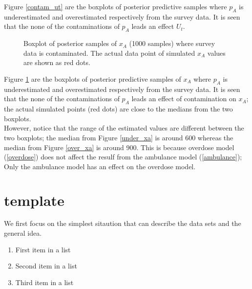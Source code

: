 \documentclass[
10pt, %
a4paper, %
oneside, %
headinclude,footinclude, %
BCOR5mm, %
]{scrartcl}
\begin{document}
Figure \ref{contam_ut} are the boxplots of posterior predictive samples where $p_A$ is underestimated and overestimated respectively from the survey data. It is seen that the none of the contaminations of $p_A$ leads an effect  $U_t$.\\

\begin{figure}[htb]
	\centering
	\caption[two early result box plots:xa]{Boxplot of posterior samples of $x_A$ (1000 samples) where survey data is contaminated.  The actual data point of simulated $x_A$ values are shown as red dots.}
	\label{contam_xt}
\end{figure}

Figure \ref{contam_xt}  are the boxplots of posterior predictive samples of $x_A$ where $p_A$ is underestimated and overestimated respectively from the survey data. It is seen that the none of the contaminations of $p_A$ leads an effect of contamination on $x_A$; the actual simulated points (red dots) are close to the medians from the two boxplots. \\

However, notice that the range of the estimated values are different between the two boxplots; the median from Figure \ref{under_xa} is around 600 whereas the median from Figure \ref{over_xa} is around 900. This is because overdose model (\ref{overdose}) does not affect the resulf from the ambulance model (\ref{ambulance}); Only the ambulance model has an effect on the overdose model. 




\section{template}
We first focus on the simplest sitaution that can describe the data sets and the general idea.


\begin{enumerate}[noitemsep] %
\item First item in a list
\item Second item in a list
\item Third item in a list
\end{enumerate}
\end{document}
